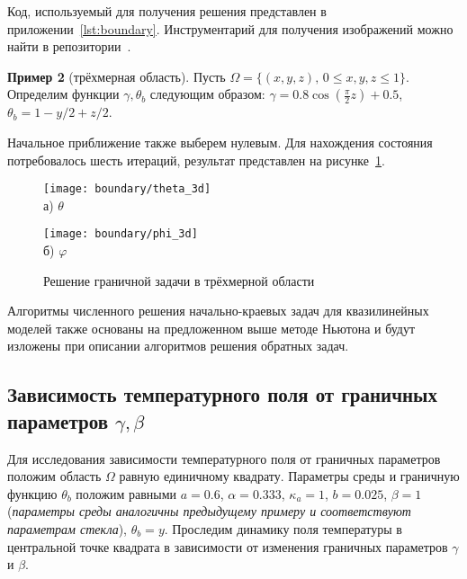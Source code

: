 Код, используемый для получения решения представлен в приложении~\ref{lst:boundary}.
Инструментарий для получения изображений можно найти в репозитории~\cite{mesenev-github}.

\textbf{Пример 2} (трёхмерная область).
Пусть $\Omega=\{(x,y,z),\, 0 \leq x,y,z \leq 1 \}$.
Определим функции $\gamma, \theta_b$ следующим образом:
$\gamma = 0.8 \cos\left(\frac{\pi}{2} z\right) + 0.5$,
$\theta_b = 1- y / 2 + z /2$.

Начальное приближение также выберем нулевым.
Для нахождения состояния потребовалось шесть итераций,
результат представлен на рисунке~\ref{fig:4_1:boundary_3d}.
\begin{figure}[h!t]
    \begin{minipage}[b][][b]{0.49\linewidth}
        \centering
        \texttt{[image: boundary/theta\_3d]} \\ а) $\theta$
    \end{minipage}
    \hfill
    \begin{minipage}[b][][b]{0.49\linewidth}
        \centering
        \texttt{[image: boundary/phi\_3d]} \\ б) $\varphi$
    \end{minipage}
    \caption{Решение граничной задачи в трёхмерной области}
    \label{fig:4_1:boundary_3d}
\end{figure}

\begin{remark}
    Алгоритмы численного решения начально-краевых задач для квазилинейных моделей
    также основаны на предложенном выше методе Ньютона и будут изложены при описании
    алгоритмов решения обратных задач.
\end{remark}

\subsection{Зависимость температурного поля от граничных параметров $\gamma, \beta$}
\label{subsec:ch4/sec1/gamma_beta}


Для исследования зависимости температурного поля от граничных параметров положим
область $\Omega$ равную единичному квадрату.
Параметры среды и граничную функцию $\theta_b$ положим равными
$a = 0.6$, $\alpha = 0.333$, $\kappa_a = 1$, $b = 0.025$, $\beta = 1$
(\textit{параметры среды аналогичны предыдущему примеру и соответствуют параметрам стекла}),
$\theta_b = y$.
Проследим динамику поля температуры
в центральной точке квадрата в зависимости от
изменения граничных параметров $\gamma$ и $\beta$.

